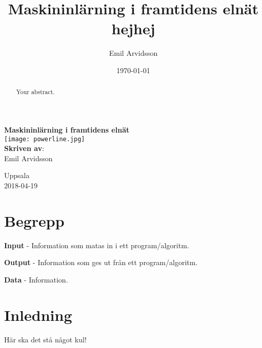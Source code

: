 \documentclass[a4paper]{article}
\title{Maskininlärning i framtidens elnät hejhej}
\author{Emil Arvidsson}
\date{\today}
\begin{document}
\begin{titlepage}
\doublespacing
\centering 
\vspace{2 cm}
{\LARGE {\bf Maskininlärning i framtidens elnät}}  \\
\vspace{1 cm}
\centering \texttt{[image: powerline.jpg]} \\	
\vspace{1 cm}
{\bf Skriven av}:\\ Emil Arvidsson\\        
\vspace{3 cm} 


Uppsala \\ 2018-04-19
\end{titlepage}


\clearpage










\begin{abstract}
Your abstract.
\end{abstract}

\clearpage

\tableofcontents

\clearpage

\section*{Begrepp}

\begin{description}
\item \textbf{Input} - Information som matas in i ett program/algoritm.
\item \textbf{Output} - Information som ges ut från ett program/algoritm.
\item \textbf{Data} - Information.

\end{description}

\clearpage

\section{Inledning}

Här ska det stå något kul!
\end{document}
